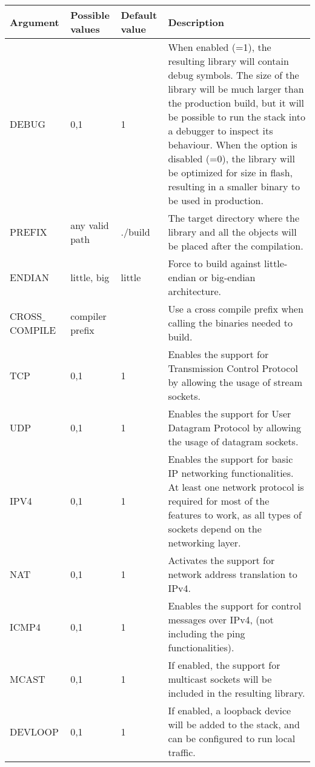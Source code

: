 \begin{longtable}{ | l | l | l | p{5cm} | }
\hline
{\bf Argument} &
{\bf Possible values} &
{\bf Default value} &
{\bf Description} 
\\ \hline

DEBUG&
0,1&
1&
When enabled (=1), the resulting library will contain debug symbols. The
size of the library will be much larger than the production build, but it
will be possible to run the stack into a debugger to inspect its behaviour.
When the option is disabled (=0), the library will be optimized for size in
flash, resulting in a smaller binary to be used in production. \\ \hline

PREFIX&
any valid path&
./build&
The target directory where the library and all the objects will be placed
after the compilation. \\ \hline

ENDIAN&
little, big &
little&
Force to build against little-endian or big-endian architecture. \\ \hline

CROSS$\_$COMPILE&
compiler prefix&
&
Use a cross compile prefix when calling the binaries needed to build.
\\ \hline

TCP&
0,1&
1&
Enables the support for Transmission Control Protocol by allowing the usage 
of stream sockets.
\\ \hline

UDP&
0,1&
1&
Enables the support for User Datagram Protocol by allowing the usage 
of datagram sockets.
\\ \hline

IPV4&
0,1&
1&
Enables the support for basic IP networking functionalities. At least one network protocol
is required for most of the features to work, as all types of sockets depend
on the networking layer.
\\ \hline

NAT&
0,1&
1&
Activates the support for network address translation to IPv4.
\\ \hline

ICMP4&
0,1&
1&
Enables the support for control messages over IPv4, (not including the ping functionalities).
\\ \hline

MCAST&
0,1&
1&
If enabled, the support for multicast sockets will be included in the resulting library.
\\ \hline

DEVLOOP&
0,1&
1&
If enabled, a loopback device will be added to the stack, and can be configured to run local traffic.
\\ \hline


\end{longtable}
